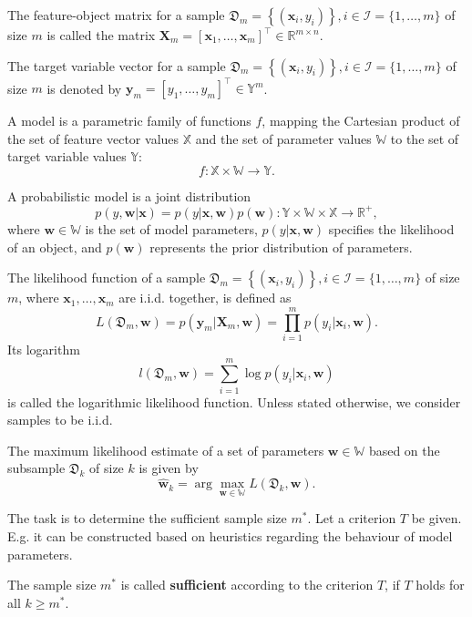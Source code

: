 \documentclass[
11pt,%
tightenlines,%
twoside,%
onecolumn,%
nofloats,%
nobibnotes,%
nofootinbib,%
superscriptaddress,%
noshowpacs,%
centertags]%
{revtex4-2}
\begin{document}
The feature-object matrix for a sample $\mathfrak{D}_m = \left\{ (\mathbf{x}_i, y_i) \right\}, i \in \mathcal{I} = \{ 1, \ldots, m \}$ of size $m$ is called the matrix $\mathbf{X}_m = \left[ \mathbf{x}_1, \ldots, \mathbf{x}_m \right]^{\top} \in \mathbb{R}^{m \times n}$.

The target variable vector for a sample $\mathfrak{D}_m = \left\{ (\mathbf{x}_i, y_i) \right\}, i \in \mathcal{I} = \{ 1, \ldots, m \}$ of size $m$ is denoted by $\mathbf{y}_m = \left[ y_1, \ldots, y_m \right]^{\top} \in \mathbb{Y}^m$.

A model is a parametric family of functions $f$, mapping the Cartesian product of the set of feature vector values $\mathbb{X}$ and the set of parameter values $\mathbb{W}$ to the set of target variable values $\mathbb{Y}$: 
\[ f: \mathbb{X} \times \mathbb{W} \to \mathbb{Y}. \]

A probabilistic model is a joint distribution
\[ p(y, \mathbf{w} | \mathbf{x}) = p(y | \mathbf{x}, \mathbf{w}) p(\mathbf{w}): \mathbb{Y} \times \mathbb{W} \times \mathbb{X} \to \mathbb{R}^+, \]
where $\mathbf{w} \in \mathbb{W}$ is the set of model parameters, $p(y | \mathbf{x}, \mathbf{w})$ specifies the likelihood of an object, and $p(\mathbf{w})$ represents the prior distribution of parameters.

The likelihood function of a sample $\mathfrak{D}_m = \left\{ (\mathbf{x}_i, y_i) \right\}, i \in \mathcal{I} = \{ 1, \ldots, m \}$ of size $m$, where $\mathbf{x}_1, \ldots, \mathbf{x}_m$ are i.i.d. together, is defined as 
\[ L(\mathfrak{D}_m, \mathbf{w}) = p(\mathbf{y}_m | \mathbf{X}_m, \mathbf{w}) = \prod_{i=1}^{m} p(y_i | \mathbf{x}_i, \mathbf{w}). \]
Its logarithm
\[ l(\mathfrak{D}_m, \mathbf{w}) = \sum\limits_{i=1}^{m} \log p(y_i | \mathbf{x}_i, \mathbf{w}) \]
is called the logarithmic likelihood function. Unless stated otherwise, we consider samples to be i.i.d.

The maximum likelihood estimate of a set of parameters $\mathbf{w} \in \mathbb{W}$ based on the subsample $\mathfrak{D}_k$ of size $k$ is given by 
\[ \hat{\mathbf{w}}_{k} = \arg\max_{\mathbf{w} \in \mathbb{W}} L(\mathfrak{D}_k, \mathbf{w}). \]

The task is to determine the sufficient sample size $m^*$. Let a criterion $T$ be given. E.g. it can be constructed based on heuristics regarding the behaviour of model parameters.
\begin{definition}
    The sample size $m^*$ is called \textbf{sufficient} according to the criterion $T$, if $T$ holds for all $k \geqslant m^*$.
\end{definition}
\end{document}
